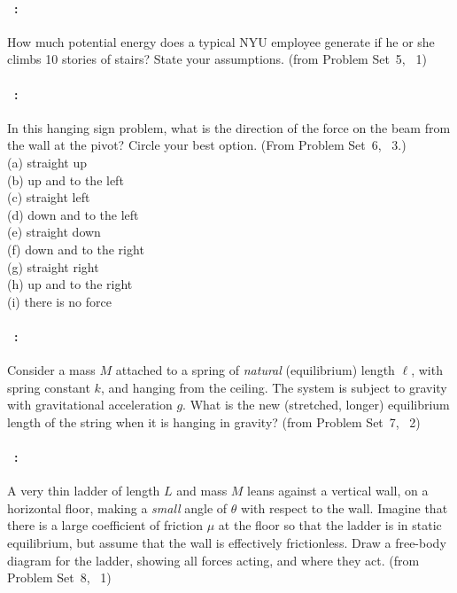 \documentclass[12pt]{article} 
\begin{document}
\vfill

\paragraph{\problemname~\theproblem:}%
How much potential energy does a typical NYU employee generate if
he or she climbs 10 stories of stairs? State your assumptions.
%
(from Problem Set~5, \problemname~1)

\vfill

\paragraph{\problemname~\theproblem:}%
In this hanging sign problem, what is the direction of the force on
the beam from the wall at the pivot? Circle your best option. (From Problem Set~6,
\problemname~3.)\\
(a) straight up\\
(b) up and to the left\\
(c) straight left\\
(d) down and to the left\\
(e) straight down\\
(f) down and to the right\\
(g) straight right\\
(h) up and to the right\\
(i) there is no force

\clearpage

\paragraph{\problemname~\theproblem:}%
Consider a mass $M$ attached to a spring of \emph{natural}
(equilibrium) length $\ell$, with spring constant $k$, and hanging
from the ceiling. The system is subject to gravity with gravitational
acceleration $g$. What is the new (stretched, longer) equilibrium
length of the string when it is hanging in gravity?
%
(from Problem Set~7, \problemname~2)

\vfill

\paragraph{\problemname~\theproblem:}%
A very thin ladder of length $L$ and mass $M$ leans against a vertical
wall, on a horizontal floor, making a \emph{small} angle of $\theta$
with respect to the wall. Imagine that there is a large coefficient of
friction $\mu$ at the floor so that the ladder is in static
equilibrium, but assume that the wall is effectively frictionless.
Draw a free-body diagram for the ladder, showing all forces acting,
and where they act.
%
(from Problem Set~8, \problemname~1)
\end{document}
